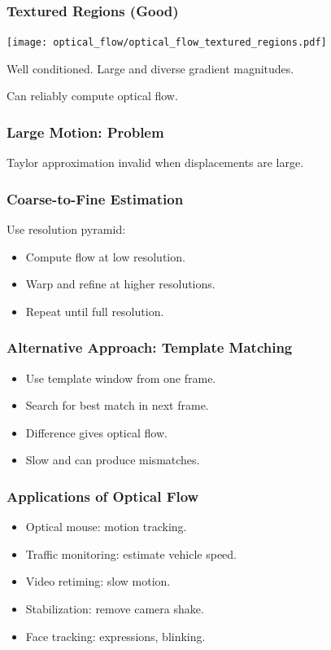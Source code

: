 \begin{frame}
    \frametitle{Textured Regions (Good)}
    \begin{center}
      \texttt{[image: optical\_flow/optical\_flow\_textured\_regions.pdf]}
    \end{center}

    Well conditioned. Large and diverse gradient magnitudes.
    
    Can reliably compute optical flow.
\end{frame}

\begin{frame}
  \frametitle{Large Motion: Problem}
  Taylor approximation invalid when displacements are large.


\end{frame}

\begin{frame}
  \frametitle{Coarse-to-Fine Estimation}
  Use resolution pyramid:
  \begin{itemize}
    \item Compute flow at low resolution.
    \item Warp and refine at higher resolutions.
    \item Repeat until full resolution.
  \end{itemize}

\end{frame}

\begin{frame}
  \frametitle{Alternative Approach: Template Matching}
  \begin{itemize}
    \item Use template window from one frame.
    \item Search for best match in next frame.
    \item Difference gives optical flow.
    \item Slow and can produce mismatches.
  \end{itemize}

\end{frame}

\begin{frame}
  \frametitle{Applications of Optical Flow}
  \begin{itemize}
    \item Optical mouse: motion tracking.
    \item Traffic monitoring: estimate vehicle speed.
    \item Video retiming: slow motion.
    \item Stabilization: remove camera shake.
    \item Face tracking: expressions, blinking.
  \end{itemize}
\end{frame}

